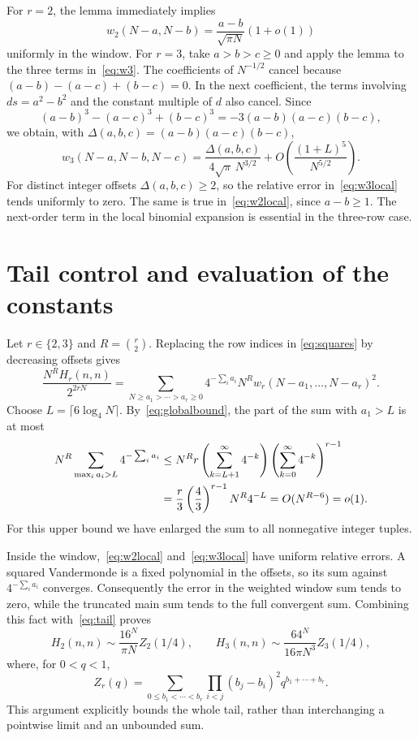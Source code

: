 \documentclass[11pt]{article}
\begin{document}
For $r=2$, the lemma immediately implies
\begin{equation}\label{eq:w2local}
 w_2(N-a,N-b)=\frac{a-b}{\sqrt{\pi N}}(1+o(1))
\end{equation}
uniformly in the window. For $r=3$, take $a>b>c\ge0$ and apply the
lemma to the three terms in~\eqref{eq:w3}. The coefficients of
$N^{-1/2}$ cancel because
$(a-b)-(a-c)+(b-c)=0$. In the next coefficient, the terms involving
$ds=a^2-b^2$ and the constant multiple of $d$ also cancel. Since
\[
 (a-b)^3-(a-c)^3+(b-c)^3
 =-3(a-b)(a-c)(b-c),
\]
we obtain, with $\Delta(a,b,c)=(a-b)(a-c)(b-c)$,
\begin{equation}\label{eq:w3local}
 w_3(N-a,N-b,N-c)=
 \frac{\Delta(a,b,c)}{4\sqrt\pi\,N^{3/2}}
 +O\left(\frac{(1+L)^5}{N^{5/2}}\right).
\end{equation}
For distinct integer offsets $\Delta(a,b,c)\ge2$, so the relative
error in~\eqref{eq:w3local} tends uniformly to zero. The same is true
in~\eqref{eq:w2local}, since $a-b\ge1$. The next-order term in the
local binomial expansion is essential in the three-row case.

\section{Tail control and evaluation of the constants}

Let $r\in\{2,3\}$ and $R=\binom r2$. Replacing the row indices in
\eqref{eq:squares} by decreasing offsets gives
\begin{equation}\label{eq:normalized}
 \frac{N^R H_r(n,n)}{2^{2rN}}
 =\sum_{N\ge a_1>\cdots>a_r\ge0}
 4^{-\sum_i a_i}N^R
 w_r(N-a_1,\ldots,N-a_r)^2.
\end{equation}
Choose $L=\lceil6\log_4N\rceil$. By~\eqref{eq:globalbound}, the
part of the sum with $a_1>L$ is at most
\begin{align}
 N^R\sum_{\max_i a_i>L}4^{-\sum_i a_i}
 &\le N^R r\left(\sum_{k=L+1}^\infty4^{-k}\right)
                \left(\sum_{k=0}^\infty4^{-k}\right)^{r-1}\notag\\
 &=\frac r3\left(\frac43\right)^{r-1}N^R4^{-L}
 =O(N^{R-6})=o(1).\label{eq:tail}
\end{align}
For this upper bound we have enlarged the sum to all nonnegative
integer tuples.

Inside the window,~\eqref{eq:w2local} and~\eqref{eq:w3local} have
uniform relative errors. A squared Vandermonde is a fixed polynomial
in the offsets, so its sum against $4^{-\sum_i a_i}$ converges.
Consequently the error in the weighted window sum tends to zero,
while the truncated main sum tends to the full convergent sum.
Combining this fact with~\eqref{eq:tail} proves
\begin{equation}\label{eq:limits}
 H_2(n,n)\sim\frac{16^N}{\pi N}Z_2(1/4),\qquad
 H_3(n,n)\sim\frac{64^N}{16\pi N^3}Z_3(1/4),
\end{equation}
where, for $0<q<1$,
\[
 Z_r(q)=\sum_{0\le b_1<\cdots<b_r}
       \prod_{i<j}(b_j-b_i)^2q^{b_1+\cdots+b_r}.
\]
This argument explicitly bounds the whole tail, rather than
interchanging a pointwise limit and an unbounded sum.
\end{document}
